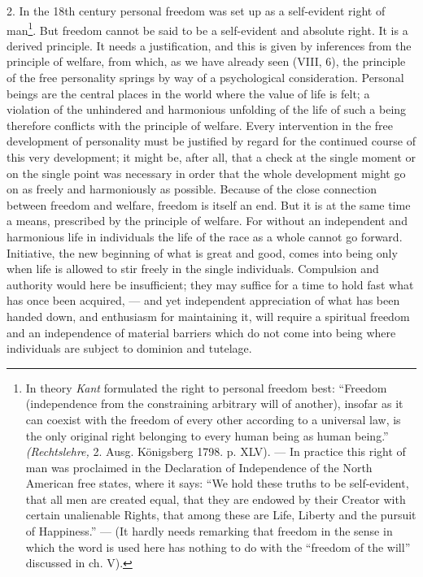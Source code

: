 \documentclass[12pt,a4paper,openany]{book}
\newcommand{\opage}[1]{\marginnote{\footnotesize\textit{[#1]}}}
\begin{document}
2. In the 18th century personal freedom was set up as a self-evident right of man\footnote[1]{In theory \emph{Kant} formulated
the right to personal freedom best: ``Freedom (independence from the constraining arbitrary will of another), insofar as
it can coexist with the freedom of every other according to a universal law, is the only original right belonging to
every human being as human being.'' \textit{(Rechtslehre,} 2. Ausg. Königsberg 1798. p. XLV).%
--- In practice this right of man was proclaimed in the Declaration of Independence of the North American free states,
where it says: ``We hold these truths to be self-evident, that all men are created equal, that they are endowed by their
Creator with certain unalienable Rights, that among these are Life, Liberty and the pursuit of Happiness.''%
--- (It hardly needs remarking that freedom in the sense in which the word is used here has nothing to do with the
``freedom of the will'' discussed in ch. V).}. But freedom cannot be said to be a self-evident and absolute right. It is
a derived principle. It needs a justification, and this is given by inferences from the principle of welfare, from
which, as we have already seen (VIII, 6), the principle of the free personality springs by way of a psychological
consideration. Personal beings are the central places in the world where the value of life is felt; a violation of the
unhindered and harmonious unfolding of the life of such a being therefore conflicts with the principle of welfare. Every
intervention in the free development of personality must be justified by regard for the continued course of this very
development; it might be, after all, that a check at the single moment or on the single point was necessary in order
that the whole development might go on as freely and harmoniously as possible. Because of the close connection between
freedom and welfare, freedom is itself an end. But it is at the same time a means, prescribed by the principle of
welfare. For without an independent and harmonious life in individuals the life of the race as a whole cannot go
forward. Initiative, the new beginning of what is great and good, comes into being only when life is allowed to stir
freely in the single individuals. Compulsion and authority would here be insufficient; they may suffice for a time to
hold fast what has once been acquired,
\opage{345}--- and yet independent appreciation of what has been handed down, and enthusiasm for maintaining it, will
require a spiritual freedom and an independence of material barriers which do not come into being where individuals are
subject to dominion and tutelage.
\end{document}
